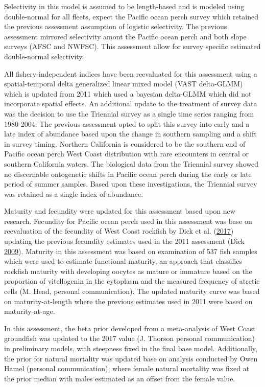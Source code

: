 \documentclass[12pt,]{article}
\begin{document}
Selectivity in this model is assumed to be length-based and is modeled
using double-normal for all fleets, expect the Pacific ocean perch
survey which retained the previous assessment assumption of logistic
selectivity. The previous assessment mirrored selectivity amont the
Pacific ocean perch and both slope surveys (AFSC and NWFSC). This
assessment allow for survey specific estimated double-normal
selectivity.

All fishery-independent indices have been reevaluated for this
assessment using a spatial-temporal delta generalized linear mixed model
(VAST delta-GLMM) which is updated from 2011 which used a bayesian
delta-GLMM which did not incorporate spatial effects. An additional
update to the treatment of survey data was the decision to use the
Triennial survey as a single time series ranging from 1980-2004. The
previous assessment opted to split this survey into early and a late
index of abundance based upon the change in southern sampling and a
shift in survey timing. Northern California is considered to be the
southern end of Pacific ocean perch West Coast distribution with rare
encounters in central or southern California waters. The biological data
from the Triennial survey showed no discernable ontogenetic shifts in
Pacific ocean perch during the early or late period of summer samples.
Based upon these investigations, the Triennial survey was retained as a
single index of abundance.

Maturity and fecundity were updated for this assessment based upon new
research. Fecundity for Pacific ocean perch used in this assessment was
base on reevaluation of the fecundity of West Coast rockfish by Dick et
al. (\protect\hyperlink{ref-dick_meta-analysis_2017}{2017}) updating the
previous fecundity estimates used in the 2011 assessment (Dick
\protect\hyperlink{ref-dick_modeling_2009}{2009}). Maturity in this
assessment was based on examination of 537 fish samples which were used
to estimate functional maturity, an approach that classifies rockfish
maturity with developing oocytes as mature or immature based on the
proportion of vitellogenin in the cytoplasm and the measured frequency
of atretic cells (M. Head, personal communication). The updated maturity
curve was based on maturity-at-length where the previous estimates used
in 2011 were based on maturity-at-age.

In this assessment, the beta prior developed from a meta-analysis of
West Coast groundfish was updated to the 2017 value (J. Thorson personal
communication) in preliminary models, with steepness fixed in the final
base model. Additionally, the prior for natural mortality was updated
base on analysis conducted by Owen Hamel (personal communication), where
female natural mortality was fixed at the prior median with males
estimated as an offset from the female value.
\end{document}
